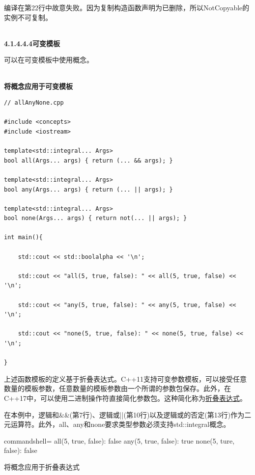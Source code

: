 编译在第22行中故意失败。因为复制构造函数声明为已删除，所以NotCopyable的实例不可复制。

\hspace*{\fill} \\ %
\noindent
\textbf{4.1.4.4.4\hspace{0.2cm}可变模板}

可以在可变模板中使用概念。

\hspace*{\fill} \\ %
\noindent
\textbf{将概念应用于可变模板}
\begin{lstlisting}[style=styleCXX]
// allAnyNone.cpp

#include <concepts>
#include <iostream>

template<std::integral... Args>
bool all(Args... args) { return (... && args); }

template<std::integral... Args>
bool any(Args... args) { return (... || args); }

template<std::integral... Args>
bool none(Args... args) { return not(... || args); }

int main(){
	
	std::cout << std::boolalpha << '\n';
	
	std::cout << "all(5, true, false): " << all(5, true, false) << '\n';
	
	std::cout << "any(5, true, false): " << any(5, true, false) << '\n';
	
	std::cout << "none(5, true, false): " << none(5, true, false) << '\n';

}
\end{lstlisting}

上述函数模板的定义基于折叠表达式。C++11支持可变参数模板，可以接受任意数量的模板参数，任意数量的模板参数由一个所谓的参数包保存。此外，在C++17中，可以使用二进制操作符直接简化参数包。这种简化称为\href{https://www.modernescpp.com/index.php/fold-expressions}{折叠表达式}。

在本例中，逻辑和\&\&(第7行)、逻辑或||(第10行)以及逻辑或的否定(第13行)作为二元运算符。此外，all、any和none要求类型参数必须支持std::integral概念。

\begin{tcblisting}{commandshell={}}
all(5, true, false): false
any(5, true, false): true
none(5, ture, false): false
\end{tcblisting}

\begin{center}
将概念应用于折叠表达式
\end{center}

